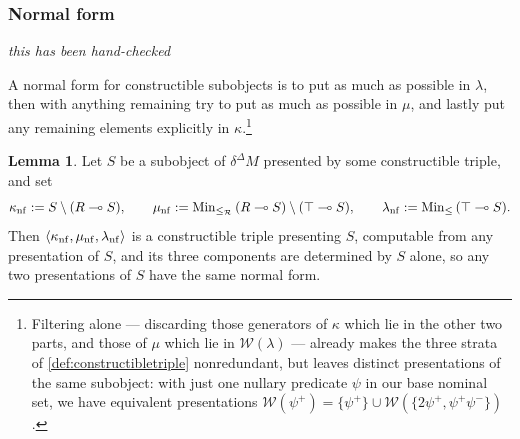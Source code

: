 \documentclass{article}
\theoremstyle{definition}
\newtheorem{lemma}{Lemma}[section]
\newcommand{\cR}{\mathcal{R}}
\newcommand{\cW}{\mathcal{W}}
\begin{document}
\subsubsection*{Normal form}

{\it this has been hand-checked}

A normal form for constructible subobjects is to put as much as possible in $\lambda$, then with anything remaining try to put as much as possible in $\mu$, and lastly put any remaining elements explicitly in $\kappa$.\footnote{Filtering alone --- discarding those generators of $\kappa$ which lie in the other two parts, and those of $\mu$ which lie in $\cW(\lambda)$ --- already makes the three strata of \cref{def:constructibletriple} nonredundant, but leaves distinct presentations of the same subobject: with just one nullary predicate $\psi$ in our base nominal set, we have equivalent presentations $\cW(\psi^+)=\{\psi^+\}\cup \cW(\{2\psi^+,\psi^+\psi^-\})$.}

\begin{lemma}
    \label{lemma:normalform}
    Let $S$ be a subobject of $\delta^\Delta M$ presented by some constructible triple, and set
    $$\kappa_{\rm nf}:=S\setminus (R\multimap S),\qquad \mu_{\rm nf}:={\rm Min}_{\leq_\cR}\,(R\multimap S) \setminus (\top \multimap S),\qquad \lambda_{\rm nf}:={\rm Min}_\leq\,(\top \multimap S).$$
    Then $\langle\kappa_{\rm nf},\mu_{\rm nf},\lambda_{\rm nf}\rangle$ is a constructible triple presenting $S$, computable from any presentation of $S$, and its three components are determined by $S$ alone, so any two presentations of $S$ have the same normal form. 
\end{lemma}
\end{document}
